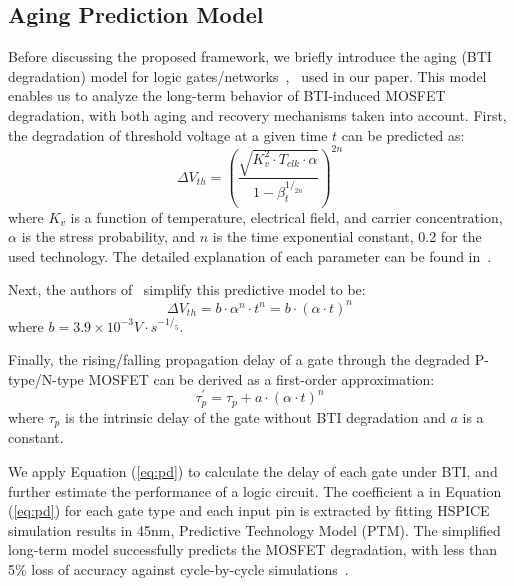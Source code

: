 \subsection{Aging Prediction Model}
\label{subsec:apm}
Before discussing the proposed framework, we briefly introduce the aging (BTI degradation) model for logic gates/networks~\cite{wang2010impact},~\cite{wang2007efficient} used in our paper. This model enables us to analyze the long-term behavior of BTI-induced MOSFET degradation, with both aging and recovery mechanisms taken into account. First, the degradation of threshold voltage at a given time $t$ can be predicted as:
\begin{equation}
\label{eq:dtv}
\Delta V_{th}=\left(\frac{\sqrt{K_v^2 \cdot T_{clk} \cdot \alpha}}{1-\beta_t^{1/_{2n}}}\right)^{2n}
\end{equation}
where $K_v$ is a function of temperature, electrical field, and carrier concentration, $\alpha$ is the stress probability, and $n$ is the time exponential constant, 0.2 for the used technology. The detailed explanation of each parameter can be found in~\cite{wang2010impact}.

Next, the authors of~\cite{wang2007efficient} simplify this predictive model to be:
\begin{equation}
\label{eq:dtv2}
\Delta V_{th}=b\cdot  \alpha^n \cdot t^n = b \cdot \left(\alpha \cdot t \right)^n
\end{equation}
where $b = 3.9 \times 10^{-3} V \cdot s^{-1/_5}$.

Finally, the rising/falling propagation delay of a gate through the degraded P-type/N-type MOSFET can be derived as a first-order approximation:
\begin{equation}
\label{eq:pd}
\tau_p^\prime = \tau_p + a \cdot \left(\alpha \cdot  t\right)^n
\end{equation}
where $\tau_p$ is the intrinsic delay of the gate without BTI degradation and $a$ is a constant.

We apply Equation (\ref{eq:pd}) to calculate the delay of each gate under BTI, and further estimate the performance of a logic circuit. The coefficient a in Equation (\ref{eq:pd}) for each gate type and each input pin is extracted by fitting HSPICE simulation results in 45nm, Predictive Technology Model (PTM). The simplified long-term model successfully predicts the MOSFET degradation, with less than 5\% loss of accuracy against cycle-by-cycle simulations~\cite{wang2010impact}.
